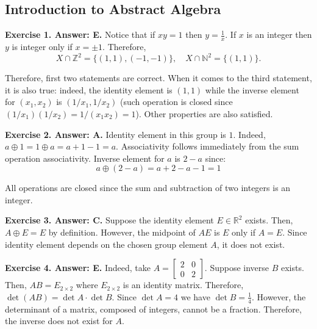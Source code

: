 \documentclass[../lecture-notes-148x210.tex]{subfiles}
\begin{document}
\subsection*{Introduction to Abstract Algebra}

\textbf{Exercise 1. Answer: E.} Notice that if $xy=1$ then $y=\frac{1}{x}$. If 
$x$ is an integer then $y$ is integer only if $x=\pm 1$. Therefore,
\begin{equation*}
    X \cap \mathbb{Z}^2 = \{(1,1),(-1,-1)\}, \quad X \cap \mathbb{N}^2 = \{(1,1)\}.
\end{equation*}

Therefore, first two statements are correct. When it comes to the third
statement, it is also true: indeed, the identity element is $(1,1)$ while the
inverse element for $(x_1,x_2)$ is $(1/x_1,1/x_2)$ (such operation is closed since
$(1/x_1)(1/x_2) = 1/(x_1x_2) = 1$). Other properties are also satisfied.

\textbf{Exercise 2. Answer: A.} Identity element in this group is $1$. Indeed,
$a \oplus 1 = 1 \oplus a = a+1-1 = a$. Associativity follows immediately from 
the sum operation associativity. Inverse element for $a$ is $2-a$ since:
\begin{equation*}
    a \oplus (2-a) = a + 2 - a - 1 = 1
\end{equation*}

All operations are closed since the sum and subtraction of two integers is an
integer.

\textbf{Exercise 3. Answer: C.} Suppose the identity element $E \in
\mathbb{R}^2$ exists. Then, $A\oplus E = E$ by definition. However, the 
midpoint of $AE$ is $E$ only if $A=E$. Since identity element depends 
on the chosen group element $A$, it does not exist.

\textbf{Exercise 4. Answer: E.} Indeed, take $A = \begin{bmatrix}
    2 & 0 \\ 0 & 2
\end{bmatrix}$. Suppose inverse $B$ exists. Then, $AB=E_{2 \times 2}$ where 
$E_{2 \times 2}$ is an identity matrix. Therefore, $\det(AB) = \det A \cdot \det B$.
Since $\det A = 4$ we have $\det B = \frac{1}{4}$. However, the determinant 
of a matrix, composed of integers, cannot be a fraction. Therefore, the inverse
does not exist for $A$.
\end{document}
